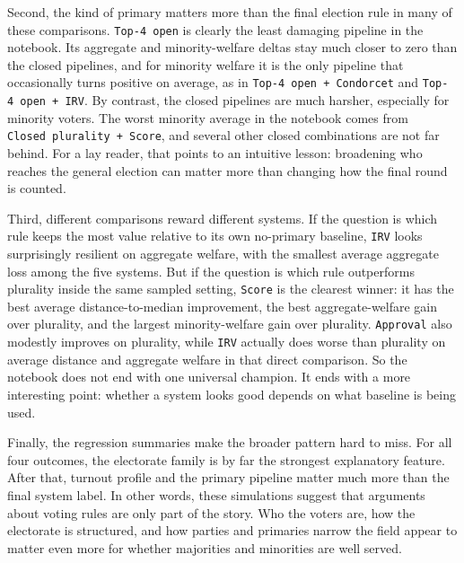 \documentclass[11pt]{article}
\begin{document}
Second, the kind of primary matters more than the final election rule in
many of these comparisons. \texttt{Top-4\ open} is clearly the least
damaging pipeline in the notebook. Its aggregate and minority-welfare
deltas stay much closer to zero than the closed pipelines, and for
minority welfare it is the only pipeline that occasionally turns
positive on average, as in \texttt{Top-4\ open\ +\ Condorcet} and
\texttt{Top-4\ open\ +\ IRV}. By contrast, the closed pipelines are much
harsher, especially for minority voters. The worst minority average in
the notebook comes from \texttt{Closed\ plurality\ +\ Score}, and
several other closed combinations are not far behind. For a lay reader,
that points to an intuitive lesson: broadening who reaches the general
election can matter more than changing how the final round is counted.

Third, different comparisons reward different systems. If the question
is which rule keeps the most value relative to its own no-primary
baseline, \texttt{IRV} looks surprisingly resilient on aggregate
welfare, with the smallest average aggregate loss among the five
systems. But if the question is which rule outperforms plurality inside
the same sampled setting, \texttt{Score} is the clearest winner: it has
the best average distance-to-median improvement, the best
aggregate-welfare gain over plurality, and the largest minority-welfare
gain over plurality. \texttt{Approval} also modestly improves on
plurality, while \texttt{IRV} actually does worse than plurality on
average distance and aggregate welfare in that direct comparison. So the
notebook does not end with one universal champion. It ends with a more
interesting point: whether a system looks good depends on what baseline
is being used.

Finally, the regression summaries make the broader pattern hard to miss.
For all four outcomes, the electorate family is by far the strongest
explanatory feature. After that, turnout profile and the primary
pipeline matter much more than the final system label. In other words,
these simulations suggest that arguments about voting rules are only
part of the story. Who the voters are, how the electorate is structured,
and how parties and primaries narrow the field appear to matter even
more for whether majorities and minorities are well served.

    


    
    
    
\end{document}
